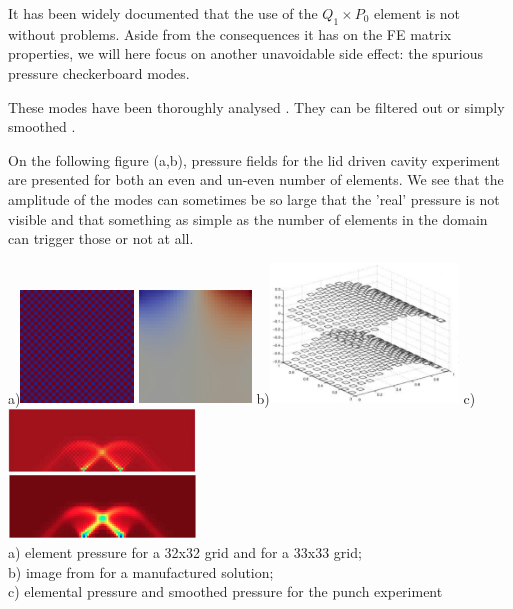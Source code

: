 
It has been widely documented that the use of the $Q_1 \times P_0$ element is not without problems. Aside from the 
consequences it has on the FE matrix properties, we will here focus on another unavoidable side effect: the spurious pressure 
checkerboard modes.  

These modes have been thoroughly analysed \cite{grsi94,chpc95,sagl81a,sagl81b}.
They can be filtered out \cite{chpc95} or simply smoothed \cite{legs79}.

On the following figure (a,b), pressure fields for the lid driven cavity experiment 
are presented for both an even and un-even number of elements. We see that 
the amplitude of the modes can sometimes be so large that the 'real' pressure is 
not visible and that something as simple as the number of elements in the 
domain can trigger those or not at all.

\begin{center}
a)\includegraphics[width=3cm]{images/checkerboard/p_el}
\includegraphics[width=3cm]{images/checkerboard/p_el_33x33}
b)\includegraphics[width=5cm]{images/checkerboard/press_doneahuerta}
c)\includegraphics[width=5cm]{images/checkerboard/douarpunch}\\
{\small a) element pressure for a 32x32 grid and for a 33x33 grid;\\ 
b) image from \cite[p307]{dohu} for a manufactured solution;\\ 
c) elemental pressure and smoothed pressure for the punch experiment \cite{thfb08}}
\end{center}

